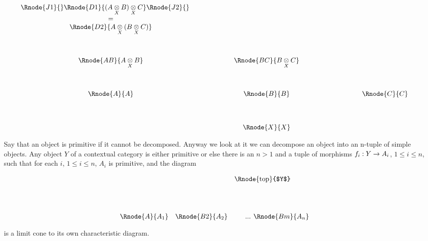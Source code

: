\documentclass[10pt,a4paper]{scrartcl}
\begin{document}
\begin{displaymath}
\begin{array}{cp{1.0cm}cp{1.0cm}c}
\Rnode{J1}{}\Rnode{D1} {\crossx{(\crossx{A}{B}{X})}{C}{X}}\Rnode{J2}{} \ \ \ \ \   &&  &&  \\ 
= && && \\
\Rnode{D2} {\crossx{A}{(\crossx{B}{C}{X})}{X}}    &&  &&                        \\ [1.3cm]
\Rnode{AB}{\crossx{A}{B}{X}}&& \Rnode{BC}{\crossx{B}{C}{X}} &&                      \\[1.3cm]
\Rnode{A}{A}&& \Rnode{B}{B} && \ \ \ \ \ \ \ \ \ \ \ \ \ \Rnode{C}{C}                                        \\[1.3cm]
             && \Rnode{X}{X} &&                                                     
\end{array}
\end{displaymath}


\noindent Say that an object is primitive if it cannot be decomposed.
\noindent Anyway we look at it we can decompose an object into an n-tuple of simple objects. 
\noindent Any object $Y$ of a contextual category \ccat is either primitive or else there is an $n > 1$ and a tuple of morphisms $f_i: Y \rightarrow A_i$, $1 \leq i \leq n$, such that for each $i$, $1 \leq i \leq n$,  $A_i$ is primitive, 
and the diagram
\begin{center}
\setlength{\arraycolsep}{0.3cm}
\begin{displaymath}
\begin{array}{ccp{0.2cm}p{0.075cm}c}
&&\Rnode{top}{$Y$}& & \\[1.5cm]
\Rnode{A}{A_1}&\Rnode{B2}{A_2}&& ... & \Rnode{Bm}{A_n}\\
\end{array}
\end{displaymath}
\end{center}
 is a limit cone to its own characteristic diagram.
\end{document}
